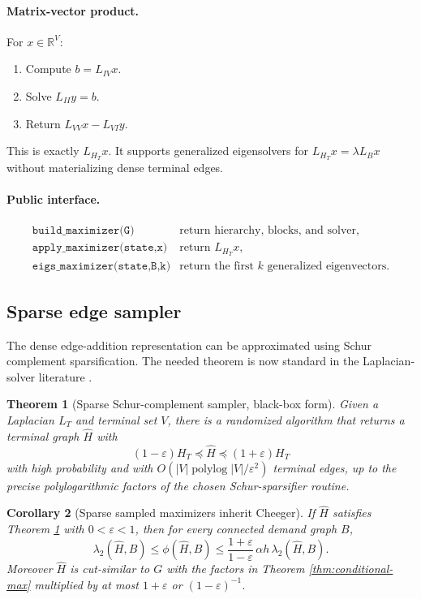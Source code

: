 \documentclass[11pt]{article}
\newtheorem{theorem}{Theorem}[section]
\newtheorem{corollary}[theorem]{Corollary}
\newcommand{\R}{\mathbb{R}}
\newcommand{\polylog}{\operatorname{polylog}}
\begin{document}
\paragraph{Matrix-vector product.}
For $x\in\R^V$:
\begin{enumerate}
\item Compute $b=L_{IV}x$.
\item Solve $L_{II}y=b$.
\item Return $L_{VV}x-L_{VI}y$.
\end{enumerate}
This is exactly $L_{H_T}x$.  It supports generalized eigensolvers for
$L_{H_T}x=\lambda L_Bx$ without materializing dense terminal edges.

\paragraph{Public interface.}
\[
\begin{array}{ll}
\texttt{build\_maximizer(G)} & \text{return hierarchy, blocks, and solver},\\
\texttt{apply\_maximizer(state,x)} & \text{return }L_{H_T}x,\\
\texttt{eigs\_maximizer(state,B,k)} & \text{return the first }k\text{ generalized eigenvectors.}
\end{array}
\]

\subsection{Sparse edge sampler}

The dense edge-addition representation can be approximated using Schur
complement sparsification.  The needed theorem is now standard in the
Laplacian-solver literature \cite{lee2015sparsified,li2018spectral}.

\begin{theorem}[Sparse Schur-complement sampler, black-box form]
\label{thm:schur-sampler}
Given a Laplacian $L_T$ and terminal set $V$, there is a randomized algorithm
that returns a terminal graph $\widehat H$ with
\[
  (1-\varepsilon)H_T\preceq \widehat H\preceq(1+\varepsilon)H_T
\]
with high probability and with
$O(|V|\polylog |V|/\varepsilon^2)$ terminal edges, up to the precise
polylogarithmic factors of the chosen Schur-sparsifier routine.
\end{theorem}

\begin{corollary}[Sparse sampled maximizers inherit Cheeger]
\label{cor:sparse-cheeger}
If $\widehat H$ satisfies Theorem \ref{thm:schur-sampler} with
$0<\varepsilon<1$, then for every connected demand graph $B$,
\[
  \lambda_2(\widehat H,B)\le\phi(\widehat H,B)
  \le
  \frac{1+\varepsilon}{1-\varepsilon}\,
  \alpha h\,\lambda_2(\widehat H,B).
\]
Moreover $\widehat H$ is cut-similar to $G$ with the factors in Theorem
\ref{thm:conditional-max} multiplied by at most $1+\varepsilon$ or
$(1-\varepsilon)^{-1}$.
\end{corollary}
\end{document}
